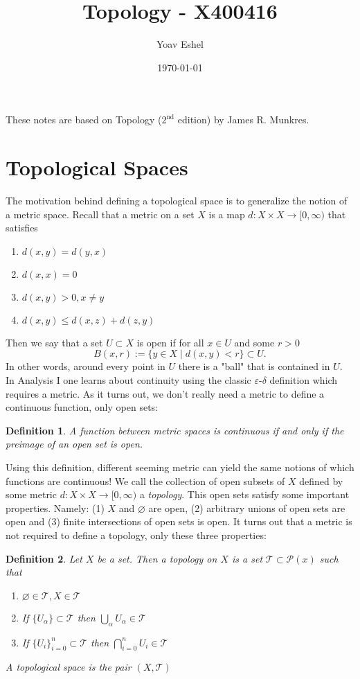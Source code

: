 \documentclass{article}
\title{Topology - X400416}
\author{Yoav Eshel}
\date{\today}
\newcommand{\Ta}{\mathcal{T}}
\newtheorem*{definition}{Definition}
\theoremstyle{remark}
\begin{document}
\maketitle
\tableofcontents
\newpage
\normalsize
These notes are based on Topology ($2^\text{nd}$ edition) by James R. Munkres. 
\section{Topological Spaces}
The motivation behind defining a topological space is to generalize the notion of a metric space.
Recall that a metric on a set $X$ is a map $d:X\times X \to [0,\infty)$ that satisfies
\begin{enumerate}
    \item $d(x,y)=d(y,x)$
    \item $d(x,x)=0$
    \item $d(x,y)>0, x\not=y$
    \item $d(x,y)\leq d(x,z)+d(z,y)$
\end{enumerate}
Then we say that a set $U\subset X$ is open if for all $x\in U$ and some $r>0$ 
$$
    B(x,r):=\{y\in X\mid d(x,y)<r\}\subset U.
$$
In other words, around every point in $U$ there is a "ball" that is contained in $U$. 
In Analysis I one learns about continuity using the classic $\varepsilon$-$\delta$ definition which requires a metric.
As it turns out, we don't really need a metric to define a continuous function, only open sets:
\begin{definition}
    A function between metric spaces is continuous if and only if the preimage of an open set is open.
\end{definition}
Using this definition, different seeming metric can yield the same notions of which functions are continuous! 
We call the collection of open subsets of $X$ defined by some metric $d:X\times X\to [0,\infty)$ a \textit{topology}.
This open sets satisfy some important properties. Namely: (1) $X$ and $\varnothing$ are open, (2) arbitrary unions of open sets are open and (3) finite intersections of open sets is open.
It turns out that a metric is not required to define a topology, only these three properties:
\begin{definition}
    Let $X$ be a set. Then a topology on $X$ is a set $\mathcal{T}\subset\mathcal{P}(x)$ such that
    \begin{enumerate}
        \item $\varnothing\in\Ta, X\in\Ta$
        \item If $\{U_{\alpha}\}\subset\Ta$ then  $\bigcup_{\alpha}U_{\alpha}\in\Ta$
        \item If $\{U_i\}_{i=0}^n\subset\Ta$ then $\bigcap_{i=0}^n U_i\in\Ta$
    \end{enumerate}
    A topological space is the pair $(X,\Ta)$
\end{definition}
\end{document}
